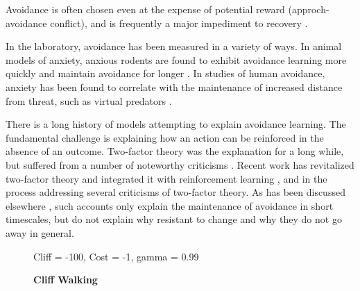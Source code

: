\documentclass[11pt]{article} %
\begin{document}
Avoidance is often chosen even at the expense of potential reward (approch-avoidance
conflict), and is frequently a major impediment to recovery \citep{Arnaudova2017}.

In the laboratory, avoidance has been measured in a variety of ways. In animal
models of anxiety, anxious rodents are found to exhibit avoidance learning more
quickly and maintain avoidance for longer \citep{servatius2008}. In studies of
human avoidance, anxiety has been found to correlate with the maintenance of
increased distance from threat, such as virtual predators \citep{Bach2014, Bach2017,
Sheynin2014}.


There is a long history of models attempting to explain avoidance learning. The
fundamental challenge is explaining how an action can be reinforced in the
absence of an outcome. Two-factor theory was the explanation for a long while,
but suffered from a number of noteworthy criticisms \citep{Krypotos2015}.
Recent work has revitalized two-factor theory and integrated it with reinforcement
learning \citep{Moutoussis2008, Maia2010}, and in the process addressing several
criticisms of two-factor theory. As has been discussed elsewhere \citep{Moutoussis2017},
such accounts only explain the maintenance of avoidance in short timescales, but
do not explain why resistant to change and why they do not go away in general.


\begin{figure}
  \centerline{%
  }
  \caption{\textbf{Cliff Walking}}
  \par Cliff = -100, Cost = -1, gamma = 0.99
\end{figure}
\end{document}
